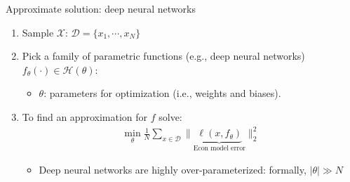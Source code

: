 \documentclass[aspectratio=169,10pt]{beamer}
\newcommand{\R}{\ensuremath{\mathbb{R}}}
\newcommand{\Xdom}{\mathcal{X}}
\newcommand{\Yrange}{\mathcal{Y}}
\newcommand{\Resid}{\mathcal{R}}
\begin{document}


\begin{frame}{Approximate solution: deep neural networks }
	\begin{enumerate}
		\item Sample $\mathcal{X}$: $\mathcal{D} = \{x_1,\cdots,x_N\}$
		\vspace{0.025in}
		\item Pick a family of parametric functions (e.g., deep neural networks) $f_\theta(\cdot) \in \mathcal{H}(\theta)$:
		\begin{itemize}
			\item $\theta$: parameters for optimization (i.e., weights and biases).  
		\end{itemize}
		\vspace{0.025in}
		\item To find an approximation for $f$ solve:
		\begin{align*}
			\min_{\theta } \frac{1}{N}\sum_{x \in \mathcal{D}} \|\underbrace{\ell(x,f_\theta)}_{\text{Econ model error}}\|_2^2
		\end{align*}
		\begin{itemize}
			\item Deep neural networks are highly over-parameterized: formally, $|\theta|\gg N$ 
		\end{itemize}
	\end{enumerate}
\end{frame}
\end{document}
